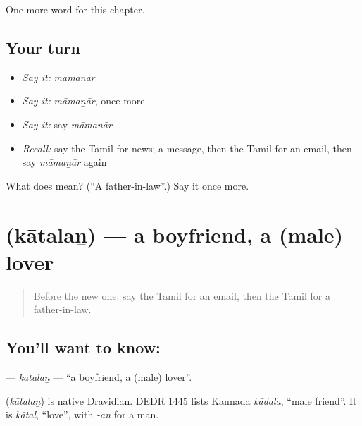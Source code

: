\begin{grammarlens}[title={What you've built}]
One more word for this chapter.
\end{grammarlens}

\subsection*{Your turn}
\begin{itemize}
\raggedright
  \item \emph{Say it:} \emph{māmaṉār}
  \item \emph{Say it:} \emph{māmaṉār}, once more
  \item \emph{Say it:} say \emph{māmaṉār}
  \item \emph{Recall:} say the Tamil for news; a message, then the Tamil for an email, then say \emph{māmaṉār} again
\end{itemize}

\begin{tcolorbox}[breakable,colback=teal!4,colframe=teal!35!black,title={Before you move on}]
What does  mean? (\textquotedblleft{}A father-in-law\textquotedblright{}.) Say it once more.
\end{tcolorbox}
\section[\texorpdfstring{\ta{காதலன்} (kātalaṉ)}{காதலன் (kātalaṉ)}]{ (kātalaṉ) — a boyfriend, a (male) lover}

\label{lesson:TA-C186-katalan}



\begin{quote}
Before the new one: say the Tamil for an email, then the Tamil for a father-in-law.
\end{quote}

\subsection*{You'll want to know: }
\textbf{} — \emph{kātalaṉ} — \textquotedblleft{}a boyfriend, a (male) lover\textquotedblright{}.

\begin{cousinweb}
\textbf{} (\emph{kātalaṉ}) is native Dravidian. DEDR 1445 lists Kannada \emph{kādala}, \textquotedblleft{}male friend\textquotedblright{}. It is \emph{kātal}, \textquotedblleft{}love\textquotedblright{}, with \emph{-aṉ} for a man.
\end{cousinweb}

